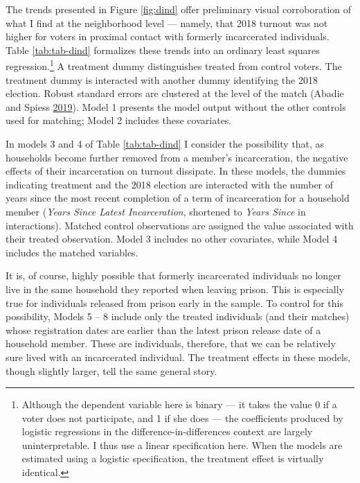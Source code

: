 \documentclass[
  12pt,
]{article}
\begin{document}
The trends presented in Figure \ref{fig:dind} offer preliminary visual corroboration of what I find at the neighborhood level --- namely, that 2018 turnout was not higher for voters in proximal contact with formerly incarcerated individuals. Table \ref{tab:tab-dind} formalizes these trends into an ordinary least squares regression.\footnote{Although the dependent variable here is binary --- it takes the value 0 if a voter does not participate, and 1 if she does --- the coefficients produced by logistic regressions in the difference-in-differences context are largely uninterpretable. I thus use a linear specification here. When the models are estimated using a logistic specification, the treatment effect is virtually identical.} A treatment dummy distinguishes treated from control voters. The treatment dummy is interacted with another dummy identifying the 2018 election. Robust standard errors are clustered at the level of the match (Abadie and Spiess \protect\hyperlink{ref-Abadie2019}{2019}). Model 1 presents the model output without the other controls used for matching; Model 2 includes these covariates.

In models 3 and 4 of Table \ref{tab:tab-dind} I consider the possibility that, as households become further removed from a member's incarceration, the negative effects of their incarceration on turnout dissipate. In these models, the dummies indicating treatment and the 2018 election are interacted with the number of years since the most recent completion of a term of incarceration for a household member (\emph{Years Since Latest Incarceration}, shortened to \emph{Years Since} in interactions). Matched control observations are assigned the value associated with their treated observation. Model 3 includes no other covariates, while Model 4 includes the matched variables.

It is, of course, highly possible that formerly incarcerated individuals no longer live in the same household they reported when leaving prison. This is especially true for individuals released from prison early in the sample. To control for this possibility, Models 5 -- 8 include only the treated individuals (and their matches) whose registration dates are earlier than the latest prison release date of a household member. These are individuals, therefore, that we can be relatively sure lived with an incarcerated individual. The treatment effects in these models, though slightly larger, tell the same general story.

\begin{singlespace}

\end{singlespace}
\end{document}
